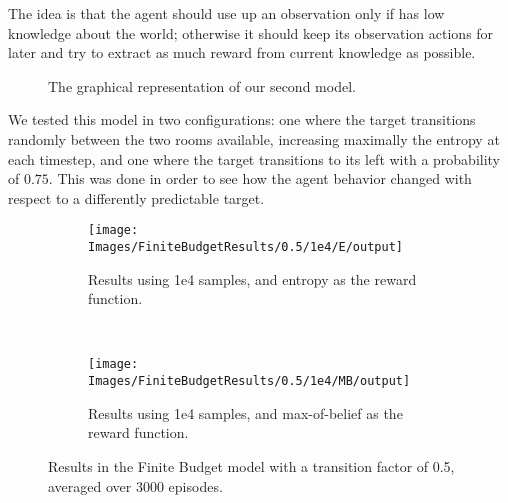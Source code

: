 The idea is that the agent should use up an observation only if has low knowledge about the world;
otherwise it should keep its observation actions for later and try to extract as much reward from
current knowledge as possible.

\begin{figure}[ht]
\centering
{}
\caption{The graphical representation of our second model.}
\label{ref:finbudget1}
\end{figure}

We tested this model in two configurations: one where the target transitions randomly between the
two rooms available, increasing maximally the entropy at each timestep, and one where the target
transitions to its left with a probability of $0.75$. This was done in order to see how the agent behavior
changed with respect to a differently predictable target.

\begin{figure}[ht]
        \centering
        \begin{subfigure}[t]{0.45\textwidth}
                \texttt{[image: Images/FiniteBudgetResults/0.5/1e4/E/output]}
                \caption{Results using 1e4 samples, and entropy as the reward function.}
                \label{fig:fb4e5}
        \end{subfigure}%
        ~ %
        \begin{subfigure}[t]{0.45\textwidth}
                \texttt{[image: Images/FiniteBudgetResults/0.5/1e4/MB/output]}
                \caption{Results using 1e4 samples, and max-of-belief as the reward function.}
                \label{fig:fb5e5}
        \end{subfigure}
        \caption{Results in the Finite Budget model with a transition factor of 0.5, averaged over 3000 episodes.}
        \label{ref:fbentropyfig5}
\end{figure}

